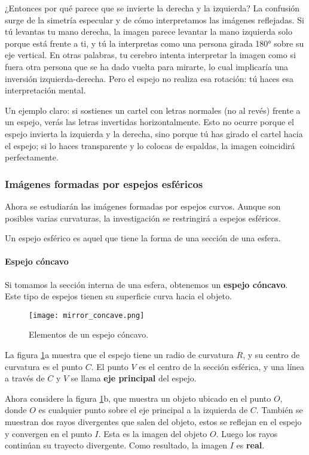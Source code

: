 ¿Entonces por qué parece que se invierte la derecha y la izquierda? La confusión surge de la simetría especular y de cómo interpretamos las imágenes reflejadas. Si tú levantas tu mano derecha, la imagen parece levantar la mano izquierda solo porque está frente a ti, y tú la interpretas como una persona girada 180° sobre su eje vertical. En otras palabras, tu cerebro intenta interpretar la imagen como si fuera otra persona que se ha dado vuelta para mirarte, lo cual implicaría una inversión izquierda-derecha. Pero el espejo no realiza esa rotación: tú haces esa interpretación mental.

Un ejemplo claro: si sostienes un cartel con letras normales (no al revés) frente a un espejo, verás las letras invertidas horizontalmente. Esto no ocurre porque el espejo invierta la izquierda y la derecha, sino porque tú has girado el cartel hacia el espejo; si lo haces transparente y lo colocas de espaldas, la imagen coincidirá perfectamente.

\subsubsection{Imágenes formadas por espejos esféricos}

Ahora se estudiarán las imágenes formadas por espejos curvos. Aunque son posibles varias curvaturas, la investigación se restringirá a espejos esféricos. 

Un espejo esférico es aquel que tiene la forma de una sección de una esfera.

\paragraph{Espejo cóncavo}

Si tomamos la sección interna de una esfera, obtenemos un \textbf{espejo cóncavo}. Este tipo de espejos tienen su superficie curva hacia el objeto.
\begin{figure}[ht]
  \centering
  \texttt{[image: mirror\_concave.png]}
  \caption{Elementos de un espejo cóncavo.}
  \label{fig:mirror_concave}
\end{figure}

La figura \ref{fig:mirror_concave}a muestra que el espejo tiene un radio de curvatura \(R\), y su centro de curvatura es el punto \(C\). El punto \(V\) es el centro de la sección esférica, y una línea a través de \(C\) y \(V\) se llama \textbf{eje principal} del espejo.

Ahora considere la figura \ref{fig:mirror_concave}b, que muestra un objeto ubicado en el punto \(O\), donde \(O\) es cualquier punto sobre el eje principal a la izquierda de \(C\). También se muestran dos rayos divergentes que salen del objeto, estos se reflejan en el espejo y convergen en el punto \(I\). Esta es la imagen del objeto \(O\). Luego los rayos continúan su trayecto divergente. Como resultado, la imagen \(I\) es \textbf{real}.


